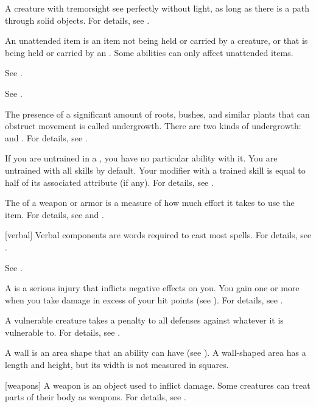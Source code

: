  A creature with tremorsight see perfectly without light, as long as there is a path through solid objects.
For details, see .

 An unattended item is an item not being held or carried by a creature, or that is being held or carried by an .
Some abilities can only affect unattended items.

 See .

 See .

 The presence of a significant amount of roots, bushes, and similar plants that can obstruct movement is called undergrowth.
There are two kinds of undergrowth:  and .
For details, see .

 If you are untrained in a , you have no particular ability with it.
You are untrained with all skills by default.
Your modifier with a trained skill is equal to half of its associated attribute (if any).
For details, see .

 The  of a weapon or armor is a measure of how much effort it takes to use the item.
For details, see  and .

[verbal] Verbal components are words required to cast most spells.
For details, see .

 See .

 A  is a serious injury that inflicts negative effects on you.
You gain one or more  when you take damage in excess of your hit points (see ).
For details, see .

 A vulnerable creature takes a  penalty to all defenses against whatever it is vulnerable to.
For details, see .

 A wall is an area shape that an ability can have (see ).
A wall-shaped area has a length and height, but its width is not measured in squares.

[weapons] A weapon is an object used to inflict damage.
Some creatures can treat parts of their body as weapons.
For details, see .

